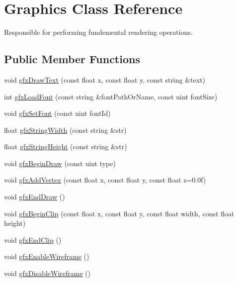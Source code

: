 \hypertarget{class_graphics}{\section{Graphics Class Reference}
\label{class_graphics}
}


Responsible for performing fundemental rendering operations.  


\subsection*{Public Member Functions}
\begin{DoxyCompactItemize}
\item 
void \hyperlink{class_graphics_a8f622d0db9014c54d7bdc37f9cb4a49a}{gfx\+Draw\+Text} (const float x, const float y, const string \&text)
\item 
int \hyperlink{class_graphics_a0d7bac934882fe3a33797c231cd83ce4}{gfx\+Load\+Font} (const string \&font\+Path\+Or\+Name, const uint font\+Size)
\item 
void \hyperlink{class_graphics_aeb86cbfdc5f98849dad77316e835ac6c}{gfx\+Set\+Font} (const uint font\+Id)
\item 
float \hyperlink{class_graphics_aa915b255eba699cf4c3aa9a4498a5ab0}{gfx\+String\+Width} (const string \&str)
\item 
float \hyperlink{class_graphics_a5866b23d270178dd7f2856fd795ad42d}{gfx\+String\+Height} (const string \&str)
\item 
void \hyperlink{class_graphics_ae925edf6f7d9efda6d94e56ebe858935}{gfx\+Begin\+Draw} (const uint type)
\item 
void \hyperlink{class_graphics_a70c6cf4503b69f16ff1b49d8a5410ece}{gfx\+Add\+Vertex} (const float x, const float y, const float z=0.\+0f)
\item 
void \hyperlink{class_graphics_af286ffa2faeadbfe7f72a17a43b1fe0d}{gfx\+End\+Draw} ()
\item 
void \hyperlink{class_graphics_a9c0bf7b24d813a5e31013b6e18f0f3c0}{gfx\+Begin\+Clip} (const float x, const float y, const float width, const float height)
\item 
void \hyperlink{class_graphics_af4a0cc5869601b4055ad60556fe29792}{gfx\+End\+Clip} ()
\item 
void \hyperlink{class_graphics_ab06d4f50a5567b91702d0e3b71a36b0c}{gfx\+Enable\+Wireframe} ()
\item 
void \hyperlink{class_graphics_ada9df052df0be7d1996827a28dbc54cd}{gfx\+Disable\+Wireframe} ()

\end{DoxyCompactItemize}
